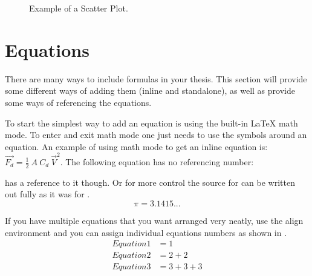   \begin{figure}[H]
    \centering
    \caption{Example of a Scatter Plot.}\label{fig:scatterplot}
  \end{figure}
  
  \clearpage
  \section{Equations}
  There are many ways to include formulas in your thesis. 
  This section will provide some different ways of adding them (inline and standalone), as well as provide some ways of referencing the equations.
  
  To start the simplest way to add an equation is using the built-in \LaTeX{} math mode. 
  To enter and exit math mode one just needs to use the  symbols around an equation.
  An example of using math mode to get an inline equation is: $\vec{F_{d}}=\frac{1}{2}\ A\ C_{d}\ \vec{V}^{2}$.
  The following equation has no referencing number:
  
   has a reference to it though. Or for more control the source for  can be written out fully as it was for .  
  \begin{equation}\label{eq:quickEq2}
    \pi = 3.1415...
  \end{equation}
  
  If you have multiple equations that you want arranged very neatly, use the align environment and you can assign individual equations numbers as shown in .
  \begin{align}%
    \label{eq:multiref:a} Equation1 & = 1\\
    \label{eq:multiref:b} Equation2 & = 2 + 2\\
    \label{eq:multiref:c} Equation3 & = 3 + 3 + 3
  \end{align}
  
  
  
  \printreferences %
